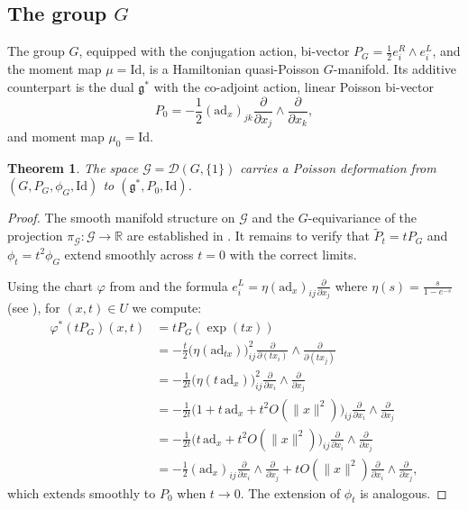 \documentclass[reqno]{amsart}
\theoremstyle{plain}
\newtheorem{Thm}{Theorem}[section]
\theoremstyle{definition}
\newcommand{\too}{\longrightarrow}
\begin{document}
\subsection{The group $G$} \label{G}

The group $G$, equipped with the conjugation action, bi-vector $P_{G} = \frac{1}{2}e^{R}_{i}\wedge e^{L}_{i}$, and the moment map $\mu = \mathrm{Id}$, is a Hamiltonian quasi-Poisson $G$-manifold. Its additive counterpart is the dual $\mathfrak{g}^{*}$ with the co-adjoint action, linear Poisson bi-vector
\[
P_{0} = -\frac{1}{2}(\mathrm{ad}_{x})_{jk}\frac{\partial}{\partial x_{j}}\wedge \frac{\partial}{\partial x_{k}},
\]
and moment map $\mu_0 = \mathrm{Id}$.

\begin{Thm}\label{thm:group-deformation}
The space $\mathcal{G} = \mathcal{D}(G, \{1\})$ carries a Poisson deformation from $(G,P_G,\phi_G,\mathrm{Id})$ to $(\mathfrak{g}^{*}, P_{0}, \mathrm{Id})$.
\end{Thm}

\begin{proof}
The smooth manifold structure on $\mathcal{G}$ and the $G$-equivariance of the projection $\pi_{\mathcal{G}}: \mathcal{G} \to \mathbb{R}$ are established in \cite[Theorem~4.1]{JMM2025deformations}. It remains to verify that $\tilde{P}_{t} = tP_{G}$ and $\phi_t = t^2\phi_G$ extend smoothly across $t=0$ with the correct limits.

Using the chart $\varphi$ from \cite[Lemma~2.1]{JMM2025deformations} and the formula $e^{L}_{i} = \eta(\mathrm{ad}_{x})_{ij}\frac{\partial}{\partial x_{j}}$ where $\eta(s) = \frac{s}{1-e^{-s}}$ (see \cite{alekseev2002quasi}), for $(x,t)\in U$ we compute:
\begin{align*}
\varphi^{*}(tP_{G})(x,t) &= tP_{G}(\exp(tx))\\
&= -\frac{t}{2}\bigl(\eta(\mathrm{ad}_{tx})\bigr)^{2}_{ij}\frac{\partial}{\partial(tx_{i})} \wedge \frac{\partial}{\partial(tx_{j})}\\
&= -\frac{1}{2t}\bigl(\eta(t\,\mathrm{ad}_{x})\bigr)^{2}_{ij} \frac{\partial}{\partial x_{i}} \wedge \frac{\partial}{\partial x_{j}}\\
&= -\frac{1}{2t}\bigl(1 + t\,\mathrm{ad}_{x} + t^{2}O(\|x\|^{2})\bigr)_{ij}\frac{\partial}{\partial x_{i}} \wedge \frac{\partial}{\partial x_{j}}\\
&= -\frac{1}{2t}\bigl(t\,\mathrm{ad}_{x} + t^{2}O(\|x\|^{2})\bigr)_{ij} \frac{\partial}{\partial x_{i}}\wedge \frac{\partial}{\partial x_{j}}\\
&= -\frac{1}{2}(\mathrm{ad}_{x})_{ij}\frac{\partial}{\partial x_{i}}\wedge \frac{\partial}{\partial x_{j}} + tO(\|x\|^{2})\frac{\partial}{\partial x_{i}}\wedge \frac{\partial}{\partial x_{j}},
\end{align*}
which extends smoothly to $P_0$ when $t \too 0.$ The extension of $\phi_t$ is analogous.
\end{proof}
\end{document}
